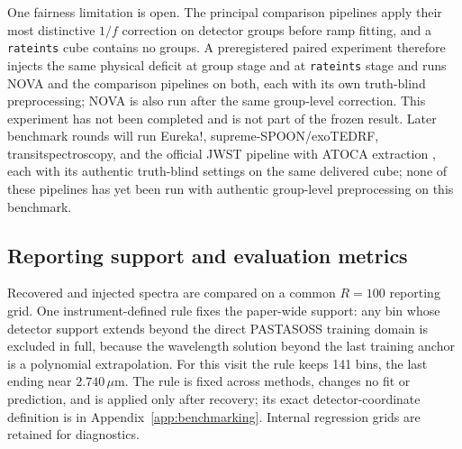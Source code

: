 One fairness limitation is open. The principal comparison pipelines apply
their most distinctive $1/f$ correction on detector groups before ramp
fitting, and a \texttt{rateints} cube contains no groups. A preregistered
paired experiment therefore injects the same physical deficit at group
stage and at \texttt{rateints} stage and runs NOVA and the comparison
pipelines on both, each with its own truth-blind preprocessing; NOVA is
also run after the same group-level correction. This experiment has not
been completed and is not part of the frozen result. Later benchmark
rounds will run Eureka!, supreme-SPOON/exoTEDRF, transitspectroscopy, and
the official JWST pipeline with ATOCA extraction
\citep{BellEtAl2022,Radica2024,Espinoza2022TransitSpectroscopy,%
JWSTPipeline2025,DarveauBernierEtAl2022,LouieEtAl2025}, each with its
authentic truth-blind settings on the same delivered cube; none of these
pipelines has yet been run with authentic group-level preprocessing on
this benchmark.

\subsection{Reporting support and evaluation metrics}


Recovered and injected spectra are compared on a common $R=100$ reporting
grid. One instrument-defined rule fixes the paper-wide support: any bin
whose detector support extends beyond the direct PASTASOSS training domain
is excluded in full, because the wavelength solution beyond the last
training anchor is a polynomial extrapolation. For this visit the rule
keeps 141 bins, the last ending near $2.740\,\mu\mathrm{m}$. The rule is
fixed across methods, changes no fit or prediction, and is applied only
after recovery; its exact detector-coordinate definition is in
Appendix~\ref{app:benchmarking}. Internal regression grids are retained
for diagnostics.

